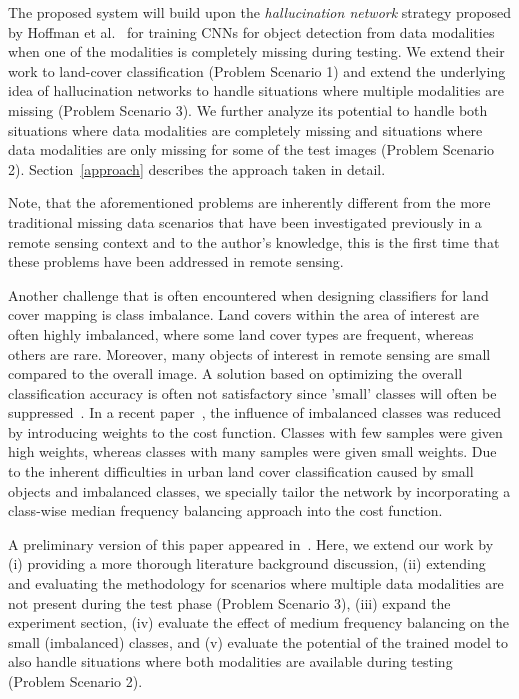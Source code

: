 \documentclass[journal]{IEEEtran}
\begin{document}
The proposed system will build upon the \emph{hallucination network} strategy proposed by Hoffman et al.~\cite{Hoffman_2016_CVPR} for training CNNs for object detection from data modalities when one of the modalities is completely missing during testing. We extend their work to land-cover classification (Problem Scenario 1) and extend the underlying idea of hallucination networks to handle situations where multiple modalities are missing (Problem Scenario 3). We further analyze its potential to handle both situations where data modalities are completely missing and situations where data modalities are only missing for some of the test images (Problem Scenario 2). Section~\ref{approach} describes the approach taken in detail.

Note, that the aforementioned problems are inherently different from the more traditional missing data scenarios that have been investigated previously in a remote sensing context and to the author's knowledge, this is the first time that these problems have been addressed in remote sensing.

Another challenge that is often encountered when designing classifiers for land cover mapping is class imbalance.
Land covers within the area of interest are often highly imbalanced, where some land cover types are frequent, whereas others are rare.
Moreover, many objects of interest in remote sensing are small compared to the overall image.
A solution based on optimizing the overall classification accuracy is often not satisfactory since 'small' classes will often be suppressed~\cite{estabrooks2004multiple}. In a recent paper~\cite{kampffmeyer2016semantic}, the influence of imbalanced classes was reduced by introducing weights to the cost function. Classes with few samples were given high weights, whereas classes with many samples were given small weights.
Due to the inherent difficulties in urban land cover classification caused by small objects and imbalanced classes, we specially tailor the network by incorporating a class-wise median frequency balancing approach into the cost function.

A preliminary version of this paper appeared in~\cite{kampffmeyer2017igarss}. Here, we extend our work by
(i) providing a more thorough literature background discussion,
(ii) extending and evaluating the methodology for scenarios where multiple data modalities are not present during the test phase (Problem Scenario 3),
(iii) expand the experiment section,
(iv) evaluate the effect of medium frequency balancing on the small (imbalanced) classes, and
(v) evaluate the potential of the trained model to also handle situations where both modalities are available during testing (Problem Scenario 2).
\end{document}
